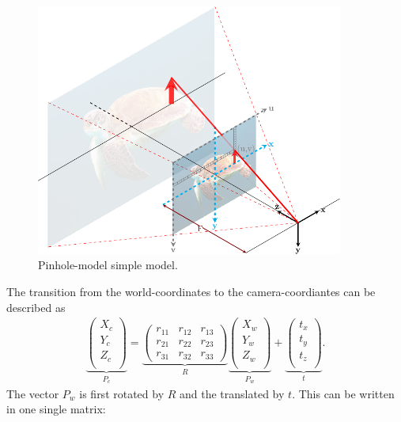 \begin{figure}[ht]
	\centering

	\includegraphics[width=0.9\textwidth]{2-theory/cam/camera3.pdf}
	\caption{Pinhole-model simple model.\label{theory:pin2}}
\end{figure}
The transition from the world-coordinates to the camera-coordiantes can be described as 
\begin{align*}
\underbrace{\begin{pmatrix}
X_c\\
Y_c\\
Z_c\\
\end{pmatrix}}_{P_c}=
\underbrace{\begin{pmatrix}
r_{11}&r_{12}&r_{13}\\
r_{21}&r_{22}&r_{23}\\
r_{31}&r_{32}&r_{33}
\end{pmatrix}}_{R}
\underbrace{\begin{pmatrix}
X_w\\
Y_w\\
Z_w\\
\end{pmatrix}}_{P_w}+
\underbrace{\begin{pmatrix}
t_x\\
t_y\\
t_z\\
\end{pmatrix}}_{t}.
\end{align*}
The vector $P_w$ is first rotated by $R$ and the translated by $t$. This can be written in one single matrix:
